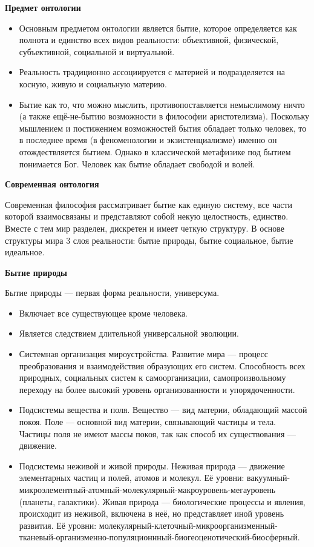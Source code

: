 \documentclass[12pt]{article}
\begin{document}
\textbf{Предмет онтологии}
\begin{itemize}
  \item Основным предметом онтологии является бытие, которое определяется как полнота и единство всех видов
реальности: объективной, физической, субъективной, социальной и виртуальной.
\item Реальность традиционно ассоциируется с материей и подразделяется на косную, живую и социальную
материю.
   \item Бытие как то, что можно мыслить, противопоставляется немыслимому ничто (а также ещё-не-бытию
возможности  в  философии  аристотелизма).  Поскольку  мышлением  и  постижением  возможностей  бытия
обладает  только  человек,  то  в  последнее  время  (в  феноменологии  и  экзистенциализме)  именно  он
отождествляется бытием. Однако в классической метафизике под бытием понимается Бог. Человек как бытие
обладает свободой и волей.
\end{itemize}

\textbf{Современная онтология}

Современная  философия  рассматривает  бытие  как  единую  систему,  все  части  которой  взаимосвязаны  и
представляют собой некую целостность, единство. Вместе с тем мир разделен, дискретен и имеет четкую
структуру. В основе структуры мира 3 слоя реальности: бытие природы, бытие социальное, бытие идеальное.

\textbf{Бытие природы}

Бытие природы — первая форма реальности, универсума.
\begin{itemize}
\item Включает все существующее кроме человека.
\item Является следствием длительной универсальной эволюции.
\item Системная организация мироустройства. Развитие мира — процесс преобразования и взаимодействия
образующих  его  систем.  Способность  всех  природных,  социальных  систем  к  самоорганизации,
самопроизвольному переходу на более высокий уровень организованности и упорядоченности.
\item Подсистемы вещества и поля. Вещество — вид материи, обладающий массой покоя. Поле — основной вид
материи, связывающий частицы и тела. Частицы поля не имеют массы покоя, так как способ их существования
— движение.
   \item Подсистемы неживой и живой природы. Неживая природа — движение элементарных частиц и полей,
атомов и молекул. Её уровни: вакуумный-микроэлементный-атомный-молекулярный-макроуровень-мегауровень
(планеты, галактики). Живая природа — биологические процессы и явления, происходит из неживой, включена
в неё, но представляет иной уровень развития. Её уровни: молекулярный-клеточный-микроорганизменный-тканевый-организменно-популяционнный-биогеоценотический-биосферный.
\end{itemize}
\end{document}

